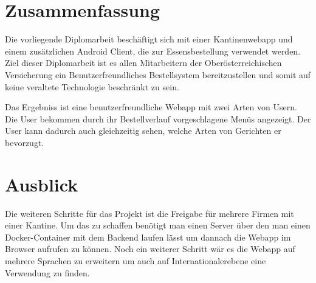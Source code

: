 \section{Zusammenfassung}
\author{Bozidar Spasenovic}
Die vorliegende Diplomarbeit beschäftigt sich mit einer Kantinenwebapp und einem zusätzlichen Android Client, die zur Essensbestellung
verwendet werden. Ziel dieser Diplomarbeit ist es allen Mitarbeitern der Oberösterreichischen Versicherung ein Benutzerfreundliches Bestellsystem
bereitzustellen und somit auf keine veraltete Technologie beschränkt zu sein. 

Das Ergebniss ist eine benutzerfreundliche Webapp mit zwei Arten von Usern. Die User bekommen durch ihr Bestellverlauf vorgeschlagene
Menüs angezeigt. Der User kann dadurch auch gleichzeitig sehen, welche Arten von Gerichten er bevorzugt.

\section{Ausblick}
Die weiteren Schritte für das Projekt ist die Freigabe für mehrere Firmen mit einer Kantine. Um das zu schaffen benötigt man einen Server
über den man einen Docker-Container mit dem Backend laufen lässt um dannach die Webapp im Browser aufrufen zu können. Noch ein
weiterer Schritt wär es die Webapp auf mehrere Sprachen zu erweitern um auch auf Internationalerebene eine Verwendung zu finden.